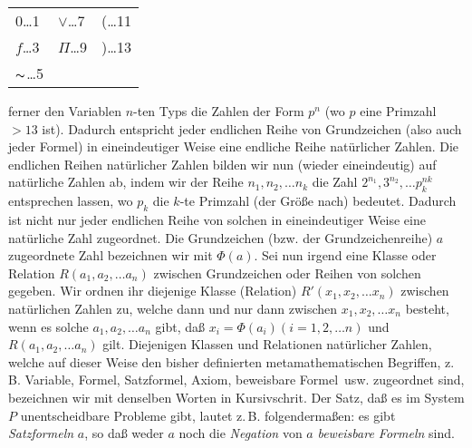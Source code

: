 \documentclass[draft]{scrartcl}
\begin{document}
\label{grundzeichenzahlen}
\begin{center}
\begin{tabular}{lll}
	\glqq$0$\grqq\dots 1 & \glqq$\lor$\grqq\dots 7 & \glqq(\grqq\dots 11 \\
	\glqq$f$\grqq\dots 3 & \glqq$\Pi$\grqq\dots 9 & \glqq)\grqq\dots 13\\
	\glqq$\thicksim$\grqq\dots 5 & &
\end{tabular}
\end{center}

\noindent ferner den Variablen $n$-ten Typs die Zahlen der
Form $p^n$ (wo $p$ eine Primzahl $> 13$ ist). Dadurch
entspricht jeder endlichen Reihe von Grundzeichen (also
auch jeder Formel) in eineindeutiger Weise
eine endliche Reihe natürlicher Zahlen. Die endlichen 
Reihen natürlicher Zahlen bilden wir nun (wieder eineindeutig) 
auf natürliche Zahlen ab, indem wir der Reihe 
$n_1, n_2, \dots n_k$ die Zahl $2^{n_1}, 3^{n_2}, \dots p_k^{nk}$
entsprechen lassen, wo $p_k$ die $k$-te
Primzahl (der Größe nach) bedeutet. Dadurch ist nicht nur
jeder endlichen Reihe von solchen in eineindeutiger Weise
eine natürliche Zahl zugeordnet. Die Grundzeichen (bzw.
der Grundzeichenreihe) $a$ zugeordnete Zahl bezeichnen
wir mit $\Phi\left(a\right)$. Sei nun irgend eine Klasse oder
Relation $R\left(a_1, a_2, \dots a_n\right)$ zwischen Grundzeichen
oder Reihen von solchen gegeben. Wir ordnen ihr diejenige
Klasse (Relation) $R'\left(x_1, x_2, \dots x_n\right)$ zwischen
natürlichen Zahlen zu, welche dann und nur dann zwischen
$x_1, x_2, \dots x_n$ besteht, wenn es solche
$a_1, a_2, \dots a_n$ gibt, daß $x_i = \Phi\left(a_i\right) \left(i = 1, 2, \dots n\right)$ und
$R\left(a_1, a_2, \dots a_n\right)$ gilt. Diejenigen
Klassen und Relationen natürlicher Zahlen, welche
auf dieser Weise den bisher definierten
metamathematischen Begriffen, z.\,B. \glqq Variable\grqq,
\glqq Formel\grqq, \glqq Satzformel\grqq, \glqq Axiom\grqq,
\glqq beweisbare Formel\grqq\ usw. zugeordnet sind,
bezeichnen wir mit denselben Worten in Kursivschrit. Der
Satz, daß es im System $P$ unentscheidbare Probleme gibt, 
lautet z.\,B. folgendermaßen: es gibt \textit{Satzformeln} $a$, 
so daß weder $a$ noch die \textit{Negation} von $a$
\textit{beweisbare Formeln} sind.
\end{document}
